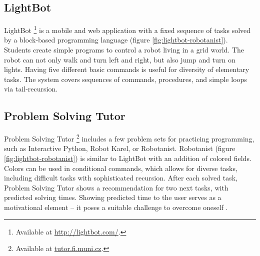 \subsection{LightBot}
\label{sec:lightbot}
LightBot%
\footnote{Available at \url{http://lightbot.com/}.}
is a mobile and web application with a fixed sequence of tasks solved by
a block-based programming language
(figure \ref{fig:lightbot-robotanist}).
Students create simple programs to control a robot living in a grid world.
The robot can not only walk and turn left and right, but also jump and turn on lights.
Having five different basic commands is useful for diversity of elementary tasks.
The system covers sequences of commands, procedures, and simple loops via tail-recursion.

%


\subsection{Problem Solving Tutor}
\label{sec:problem-solving-tutor}
Problem Solving Tutor%
\footnote{Available at \url{tutor.fi.muni.cz}.}
includes a few problem sets for practicing programming,
such as Interactive Python, Robot Karel, or Robotanist.
Robotanist (figure \ref{fig:lightbot-robotanist}) is similar to LightBot
with an addition of colored fields.
Colors can be used in conditional commands, which allows for diverse tasks,
including difficult tasks with sophisticated recursion.  After
each solved task, Problem Solving Tutor shows a recommendation for two next
tasks, with predicted solving times.
Showing predicted time to the user serves as a motivational element -- it poses
a suitable challenge to overcome oneself
\cite{pelanek-student-modeling-times}.


